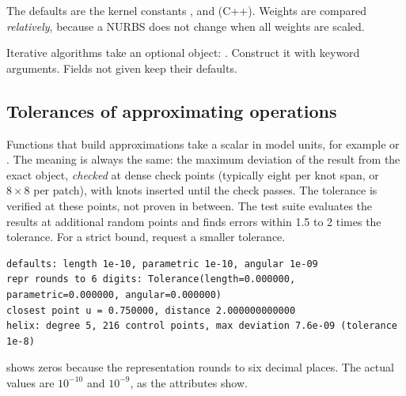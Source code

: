The defaults are the kernel constants ,  and
 (C++). Weights are compared \emph{relatively}, because a NURBS does not change
when all weights are scaled.

Iterative algorithms take an optional  object:
. Construct it with keyword arguments.
Fields not given keep their defaults.

\subsection{Tolerances of approximating operations}
Functions that build approximations take a scalar  in model units, for example
 or . The meaning
is always the same: the maximum deviation of the result from the exact object, \emph{checked} at
dense check points (typically eight per knot span, or $8\times8$ per patch), with knots inserted
until the check passes. The tolerance is verified at these points, not proven in between. The
test suite evaluates the results at additional random points and finds errors within 1.5 to 2
times the tolerance. For a strict bound, request a smaller tolerance.


\begin{lstlisting}[style=text]
defaults: length 1e-10, parametric 1e-10, angular 1e-09
repr rounds to 6 digits: Tolerance(length=0.000000, parametric=0.000000, angular=0.000000)
closest point u = 0.750000, distance 2.000000000000
helix: degree 5, 216 control points, max deviation 7.6e-09 (tolerance 1e-8)
\end{lstlisting}

\begin{warning}
 shows zeros because the representation rounds to six decimal
places. The actual values are $10^{-10}$ and $10^{-9}$, as the attributes show.
\end{warning}

